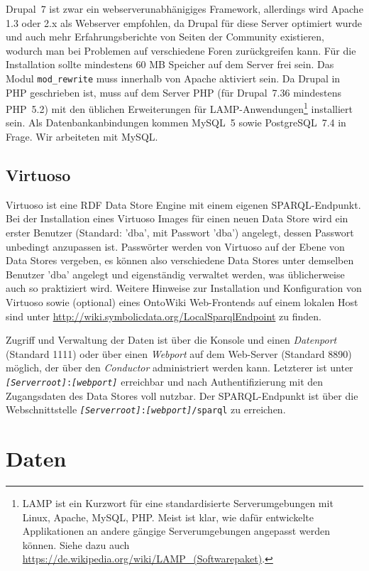 \documentclass[a4paper,11pt,twoside]{article}
\begin{document}
Drupal~7 ist zwar ein webserverunabhänigiges Framework, allerdings wird Apache
1.3 oder 2.x als Webserver empfohlen, da Drupal für diese Server optimiert
wurde und auch mehr Erfahrungsberichte von Seiten der Community existieren,
wodurch man bei Problemen auf verschiedene Foren zurückgreifen kann. Für die
Installation sollte mindestens 60 MB Speicher auf dem Server frei sein. Das
Modul \texttt{mod\_rewrite} muss innerhalb von Apache aktiviert sein. Da Drupal
in PHP geschrieben ist, muss auf dem Server PHP (für Drupal~7.36 mindestens
PHP~5.2) mit den üblichen Erweiterungen für LAMP-Anwendungen\footnote{LAMP ist
  ein Kurzwort für eine standardisierte Serverumgebungen mit Linux, Apache,
  MySQL, PHP.  Meist ist klar, wie dafür entwickelte Applikationen an andere
  gängige Serverumgebungen angepasst werden können. Siehe dazu auch
  \url{https://de.wikipedia.org/wiki/LAMP_(Softwarepaket)}.}  installiert
sein. Als Datenbankanbindungen kommen MySQL~5 sowie PostgreSQL~7.4 in
Frage. Wir arbeiteten mit MySQL.

\subsection{Virtuoso}

Virtuoso ist eine RDF Data Store Engine mit einem eigenen SPARQL-Endpunkt.
Bei der Installation eines Virtuoso Images für einen neuen Data Store wird ein
erster Benutzer (Standard: 'dba', mit Passwort 'dba') angelegt, dessen
Passwort unbedingt anzupassen ist.  Passwörter werden von Virtuoso auf der
Ebene von Data Stores vergeben, es können also verschiedene Data Stores unter
demselben Benutzer 'dba' angelegt und eigenständig verwaltet werden, was
üblicherweise auch so praktiziert wird. Weitere Hinweise zur Installation und
Konfiguration von Virtuoso sowie (optional) eines OntoWiki Web-Frontends auf
einem lokalen Host sind unter
\url{http://wiki.symbolicdata.org/LocalSparqlEndpoint} zu finden.

Zugriff und Verwaltung der Daten ist über die Konsole und einen
\emph{Datenport} (Standard 1111) oder über einen \emph{Webport} auf dem
Web-Server (Standard 8890) möglich, der über den \emph{Conductor} administriert
werden kann.  Letzterer ist unter
\texttt{\textit{[Serverroot]}:\textit{[webport]}} erreichbar und nach
Authentifizierung mit den Zugangsdaten des Data Stores voll nutzbar.  Der
SPARQL-Endpunkt ist über die Webschnittstelle
\texttt{\textit{[Serverroot]}:\textit{[webport]}/sparql} zu erreichen.

\section{Daten}
\end{document}
